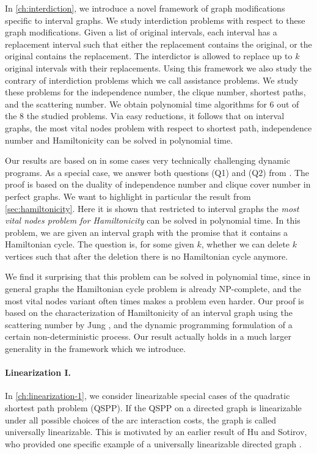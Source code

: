 In \cref{ch:interdiction}, we introduce a novel framework of graph modifications specific to interval graphs. We study interdiction problems with respect to these graph modifications. 
Given a list of original intervals, each interval has a replacement interval such that either the replacement contains the original, or the original contains the replacement. 
The interdictor is allowed to replace up to $k$ original intervals with their replacements. 
Using this framework we also study the contrary of interdiction problems which we call assistance problems. We study these problems for the independence number, the clique number, shortest paths, and the scattering number. 
We obtain polynomial time algorithms for 6 out of the 8 the studied problems. Via easy reductions, it follows that on interval graphs, the most vital nodes problem with respect to shortest path, independence number and Hamiltonicity can be solved in polynomial time.

Our results are based on in some cases very technically challenging dynamic programs. As a special case, we answer both questions (Q1) and (Q2) from \cite{diner2018contractionDeletionBlockers}. The proof is based on the duality of independence number and clique cover number in perfect graphs. We want to highlight in particular the result from \cref{sec:hamiltonicity}. 
Here it is shown that restricted to interval graphs the \emph{most vital nodes problem for Hamiltonicity} can be solved in polynomial time. 
In this problem, we are given an interval graph with the promise that it contains a Hamiltonian cycle. The question is, for some given $k$, whether we can delete $k$ vertices such that after the deletion there is no Hamiltonian cycle anymore. 

We find it surprising that this problem can be solved in polynomial time, since in general graphs the Hamiltonian cycle problem is already NP-complete, and the most vital nodes variant often times makes a problem even harder. Our proof is based on the characterization of Hamiltonicity of an interval graph using the scattering number by Jung \cite{jung1978scat}, and the dynamic programming formulation of a certain non-deterministic process. Our result actually holds in a much larger generality in the framework which we introduce.

\paragraph*{Linearization I.}
In \cref{ch:linearization-1}, we consider linearizable special cases of the quadratic shortest path problem (QSPP). If the QSPP on a directed graph is linearizable under all possible choices of the arc interaction costs, the graph is called universally linearizable. This is motivated by an earlier result of Hu and Sotirov, who provided one specific example of a universally linearizable directed graph \cite{huSo2018}.

